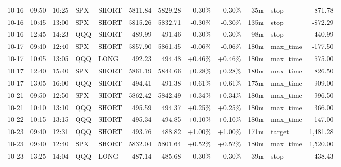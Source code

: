 \documentclass[11pt,a4paper,twoside]{article}
\begin{document}
\begin{center}
\begin{longtable}{>{\color{txtmain}}l l l l l r r r r r >{\color{txtmain}}l r}
10-16 & 09:50 & 10:25 & SPX & SHORT & 5811.84 & 5829.28 & \textcolor{lossred}{-0.30\%} & \textcolor{lossred}{-0.30\%} & 35m & stop & \textcolor{lossred}{-871.78} \\
10-16 & 10:45 & 13:00 & SPX & SHORT & 5815.26 & 5832.71 & \textcolor{lossred}{-0.30\%} & \textcolor{lossred}{-0.30\%} & 135m & stop & \textcolor{lossred}{-872.29} \\
10-16 & 12:45 & 14:23 & QQQ & SHORT & 489.99 & 491.46 & \textcolor{lossred}{-0.30\%} & \textcolor{lossred}{-0.30\%} & 98m & stop & \textcolor{lossred}{-440.99} \\
10-17 & 09:40 & 12:40 & SPX & SHORT & 5857.90 & 5861.45 & \textcolor{lossred}{-0.06\%} & \textcolor{lossred}{-0.06\%} & 180m & max\_time & \textcolor{lossred}{-177.50} \\
10-17 & 10:05 & 13:05 & QQQ & LONG & 492.23 & 494.48 & \textcolor{wingreen}{+0.46\%} & \textcolor{wingreen}{+0.46\%} & 180m & max\_time & \textcolor{wingreen}{675.00} \\
10-17 & 12:40 & 15:40 & SPX & SHORT & 5861.19 & 5844.66 & \textcolor{wingreen}{+0.28\%} & \textcolor{wingreen}{+0.28\%} & 180m & max\_time & \textcolor{wingreen}{826.50} \\
10-17 & 13:05 & 16:00 & QQQ & SHORT & 494.41 & 491.38 & \textcolor{wingreen}{+0.61\%} & \textcolor{wingreen}{+0.61\%} & 175m & max\_time & \textcolor{wingreen}{909.00} \\
10-21 & 09:50 & 12:50 & SPX & SHORT & 5862.42 & 5842.49 & \textcolor{wingreen}{+0.34\%} & \textcolor{wingreen}{+0.34\%} & 180m & max\_time & \textcolor{wingreen}{996.50} \\
10-21 & 10:10 & 13:10 & QQQ & SHORT & 495.59 & 494.37 & \textcolor{wingreen}{+0.25\%} & \textcolor{wingreen}{+0.25\%} & 180m & max\_time & \textcolor{wingreen}{366.00} \\
10-22 & 10:15 & 13:15 & QQQ & SHORT & 495.34 & 494.85 & \textcolor{wingreen}{+0.10\%} & \textcolor{wingreen}{+0.10\%} & 180m & max\_time & \textcolor{wingreen}{147.00} \\
10-23 & 09:40 & 12:31 & QQQ & SHORT & 493.76 & 488.82 & \textcolor{wingreen}{+1.00\%} & \textcolor{wingreen}{+1.00\%} & 171m & target & \textcolor{wingreen}{1,481.28} \\
10-23 & 09:40 & 12:40 & SPX & SHORT & 5832.04 & 5801.64 & \textcolor{wingreen}{+0.52\%} & \textcolor{wingreen}{+0.52\%} & 180m & max\_time & \textcolor{wingreen}{1,520.00} \\
10-23 & 13:25 & 14:04 & QQQ & LONG & 487.14 & 485.68 & \textcolor{lossred}{-0.30\%} & \textcolor{lossred}{-0.30\%} & 39m & stop & \textcolor{lossred}{-438.43} \\

\end{longtable}
\end{center}
\end{document}
